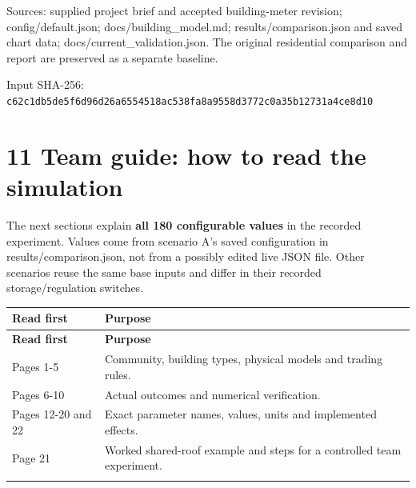 \documentclass[a4paper,11pt]{article}
\begin{document}
{\small Sources: supplied project brief and accepted building-meter revision; config/default.json; docs/building\_model.md; results/comparison.json and saved chart data; docs/current\_validation.json. The original residential comparison and report are preserved as a separate baseline.\par}
\par\medskip

{\small Input SHA-256: \texttt{c62c1db5\allowbreak{}de5f6d96\allowbreak{}d26a6554\allowbreak{}518ac538\allowbreak{}fa8a9558\allowbreak{}d3772c0a\allowbreak{}35b12731\allowbreak{}a4ce8d10}\par}
\par\medskip

\clearpage

\section*{11  Team guide: how to read the simulation}
\par\medskip

The next sections explain \textbf{all 180 configurable values} in the recorded experiment. Values come from scenario A's saved configuration in results/comparison.json, not from a possibly edited live JSON file. Other scenarios reuse the same base inputs and differ in their recorded storage/regulation switches.
\par\medskip

\begingroup\small
\begin{longtable}{>{\RaggedRight\arraybackslash}p{}>{\RaggedRight\arraybackslash}p{}}
\toprule
\textbf{Read first} & \textbf{Purpose} \\ \midrule
\endfirsthead
\toprule
\textbf{Read first} & \textbf{Purpose} \\ \midrule
\endhead
Pages 1-5 & Community, building types, physical models and trading rules. \\ \addlinespace[3pt]
Pages 6-10 & Actual outcomes and numerical verification. \\ \addlinespace[3pt]
Pages 12-20 and 22 & Exact parameter names, values, units and implemented effects. \\ \addlinespace[3pt]
Page 21 & Worked shared-roof example and steps for a controlled team experiment. \\ \addlinespace[3pt]
\bottomrule
\end{longtable}
\endgroup
\end{document}
